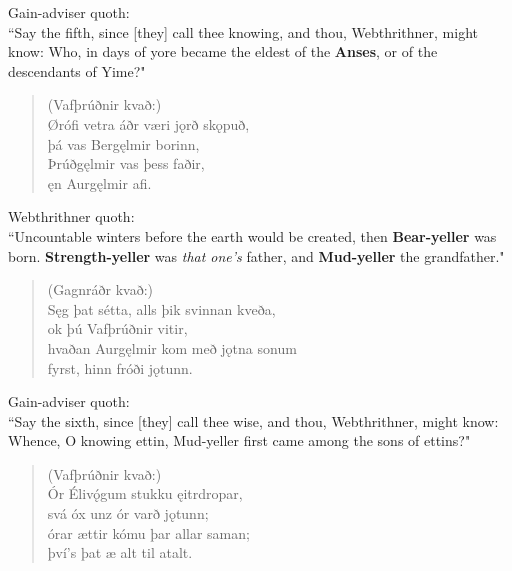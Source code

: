 \bvb Gain-adviser quoth: \\ “Say the fifth, since [they] call thee knowing, and thou, Webthrithner, might know: Who, in days of yore became the eldest of the \textbf{Anses}, or of the descendants of Yime?" \\

\begin{verse}
(Vafþrúðnir kvað:) \\%
\bva Ørófi vetra \hld áðr væri jǫrð skǫpuð, \\%
\ind þá vas Bergęlmir borinn, \\%
Þrúðgęlmir \hld vas þess faðir, \\%
\ind ęn Aurgęlmir afi.\\%
\end{verse}

\bvb Webthrithner quoth: \\ “Uncountable winters before the earth would be created, then \textbf{Bear-yeller} was born. \textbf{Strength-yeller} was \emph{that one's} father, and \textbf{Mud-yeller} the grandfather." \\

\begin{verse}
(Gagnráðr kvað:) \\%
\bva Sęg þat sétta, \hld alls þik svinnan kveða, \\%
\ind ok þú Vafþrúðnir vitir, \\%
hvaðan Aurgęlmir kom \hld með jǫtna sonum \\%
\ind fyrst, hinn fróði jǫtunn.\\%
\end{verse}

\bvb Gain-adviser quoth: \\ “Say the sixth, since [they] call thee wise, and thou, Webthrithner, might know: Whence, O knowing ettin, Mud-yeller first came among the sons of ettins?" \\

\begin{verse}
(Vafþrúðnir kvað:) \\%
\bva Ór Élivǫ́gum \hld stukku ęitrdropar, \\%
\ind svá óx unz ór varð jǫtunn; \\%
órar ættir \hld kómu þar allar saman; \\%
\ind því's þat æ alt til atalt.\footnotemark[20]\\%
\end{verse}

